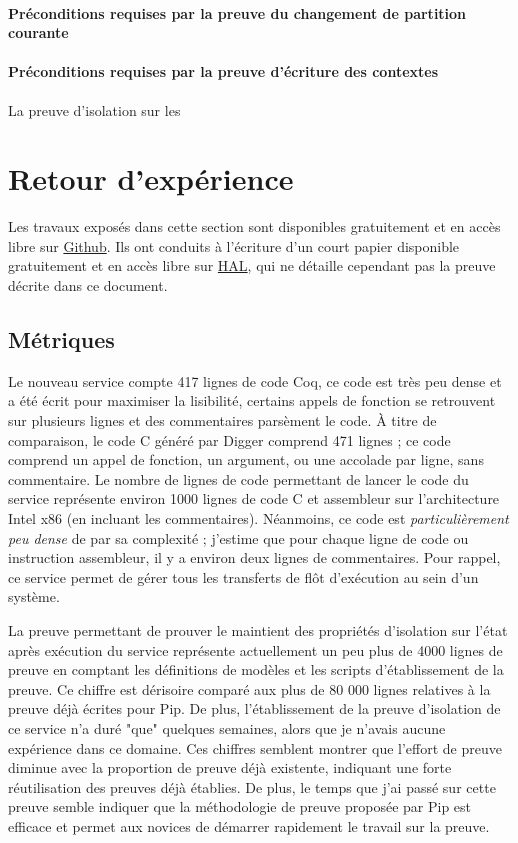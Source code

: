 			\paragraph{Préconditions requises par la preuve du changement de partition courante}

			\paragraph{Préconditions requises par la preuve d'écriture des contextes}

			La preuve d'isolation sur les 


	\section{Retour d'expérience}
	Les travaux exposés dans cette section sont disponibles gratuitement et en accès libre sur \href{https://github.com/2xs/pipcore}{Github}. Ils ont conduits à l'écriture d'un court papier disponible gratuitement et en accès libre sur \href{https://hal.archives-ouvertes.fr/hal-02347481}{HAL}, qui ne détaille cependant pas la preuve décrite dans ce document.

		\subsection{Métriques}

		Le nouveau service compte 417 lignes de code Coq, ce code est très peu dense et a été écrit pour maximiser la lisibilité, certains appels de fonction se retrouvent sur plusieurs lignes et des commentaires parsèment le code. À titre de comparaison, le code C généré par Digger comprend 471 lignes ; ce code comprend un appel de fonction, un argument, ou une accolade par ligne, sans commentaire. Le nombre de lignes de code permettant de lancer le code du service représente environ 1000 lignes de code C et assembleur sur l'architecture Intel x86 (en incluant les commentaires). Néanmoins, ce code est \emph{particulièrement peu dense} de par sa complexité ; j'estime que pour chaque ligne de code ou instruction assembleur, il y a environ deux lignes de commentaires. 
		Pour rappel, ce service permet de gérer tous les transferts de flôt d'exécution au sein d'un système. 

		La preuve permettant de prouver le maintient des propriétés d'isolation sur l'état après exécution du service représente actuellement un peu plus de 4000 lignes de preuve en comptant les définitions de modèles et les scripts d'établissement de la preuve. Ce chiffre est dérisoire comparé aux plus de 80 000 lignes relatives à la preuve déjà écrites pour Pip. De plus, l'établissement de la preuve d'isolation de ce service n'a duré "que" quelques semaines, alors que je n'avais aucune expérience dans ce domaine. Ces chiffres semblent montrer que l'effort de preuve diminue avec la proportion de preuve déjà existente, indiquant une forte réutilisation des preuves déjà établies. De plus, le temps que j'ai passé sur cette preuve semble indiquer que la méthodologie de preuve proposée par Pip est efficace et permet aux novices de démarrer rapidement le travail sur la preuve.

